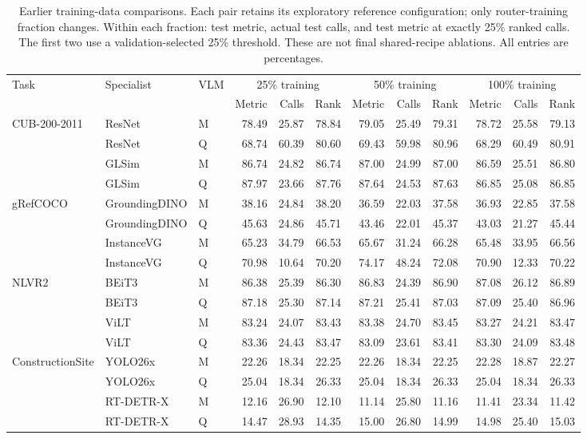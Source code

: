 \begin{table}[H]
\centering
\caption{Earlier training-data comparisons. Each pair retains its exploratory reference configuration; only router-training fraction changes. Within each fraction: test metric, actual test calls, and test metric at exactly 25\% ranked calls. The first two use a validation-selected 25\% threshold. These are not final shared-recipe ablations. All entries are percentages.}
\label{tab:scaling_full}
\fontsize{8.5}{10.2}\selectfont
\setlength{\tabcolsep}{3pt}
\renewcommand{\arraystretch}{1.12}
\begin{tabular}{@{}lllrrrrrrrrr@{}}
\toprule
Task & Specialist & VLM & \multicolumn{3}{c}{25\% training} & \multicolumn{3}{c}{50\% training} & \multicolumn{3}{c}{100\% training}\\ \cmidrule(lr){4-6}\cmidrule(lr){7-9}\cmidrule(l){10-12} & & & Metric & Calls & Rank & Metric & Calls & Rank & Metric & Calls & Rank \\
\midrule
CUB-200-2011 & ResNet & M & 78.49 & 25.87 & 78.84 & 79.05 & 25.49 & 79.31 & 78.72 & 25.58 & 79.13 \\
 & ResNet & Q & 68.74 & 60.39 & 80.60 & 69.43 & 59.98 & 80.96 & 68.29 & 60.49 & 80.91 \\
 & GLSim & M & 86.74 & 24.82 & 86.74 & 87.00 & 24.99 & 87.00 & 86.59 & 25.51 & 86.80 \\
 & GLSim & Q & 87.97 & 23.66 & 87.76 & 87.64 & 24.53 & 87.63 & 86.85 & 25.08 & 86.85 \\
\midrule
gRefCOCO & GroundingDINO & M & 38.16 & 24.84 & 38.20 & 36.59 & 22.03 & 37.58 & 36.93 & 22.85 & 37.58 \\
 & GroundingDINO & Q & 45.63 & 24.86 & 45.71 & 43.46 & 22.01 & 45.37 & 43.03 & 21.27 & 45.44 \\
 & InstanceVG & M & 65.23 & 34.79 & 66.53 & 65.67 & 31.24 & 66.28 & 65.48 & 33.95 & 66.56 \\
 & InstanceVG & Q & 70.98 & 10.64 & 70.20 & 74.17 & 48.24 & 72.08 & 70.90 & 12.33 & 70.22 \\
\midrule
NLVR2 & BEiT3 & M & 86.38 & 25.39 & 86.30 & 86.83 & 24.39 & 86.90 & 87.08 & 26.12 & 86.89 \\
 & BEiT3 & Q & 87.18 & 25.30 & 87.14 & 87.21 & 25.41 & 87.03 & 87.09 & 25.40 & 86.96 \\
 & ViLT & M & 83.24 & 24.07 & 83.43 & 83.38 & 24.70 & 83.45 & 83.27 & 24.21 & 83.47 \\
 & ViLT & Q & 83.36 & 24.43 & 83.47 & 83.09 & 23.61 & 83.41 & 83.30 & 24.09 & 83.48 \\
\midrule
ConstructionSite & YOLO26x & M & 22.26 & 18.34 & 22.25 & 22.26 & 18.34 & 22.25 & 22.28 & 18.87 & 22.27 \\
 & YOLO26x & Q & 25.04 & 18.34 & 26.33 & 25.04 & 18.34 & 26.33 & 25.04 & 18.34 & 26.33 \\
 & RT-DETR-X & M & 12.16 & 26.90 & 12.10 & 11.14 & 25.80 & 11.16 & 11.41 & 23.34 & 11.42 \\
 & RT-DETR-X & Q & 14.47 & 28.93 & 14.35 & 15.00 & 26.80 & 14.99 & 14.98 & 25.40 & 15.03 \\
\bottomrule
\end{tabular}
\end{table}
